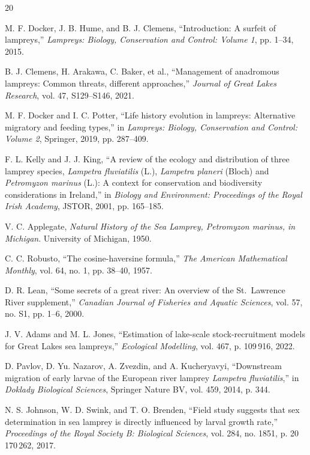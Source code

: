 \documentclass[11pt,a4paper]{ctexart}
\begin{document}
\begin{thebibliography}{20}

 M. F. Docker, J. B. Hume, and B. J. Clemens, ``Introduction: A surfeit of lampreys,'' \emph{Lampreys: Biology, Conservation and Control: Volume 1}, pp. 1--34, 2015.

 B. J. Clemens, H. Arakawa, C. Baker, et al., ``Management of anadromous lampreys: Common threats, different approaches,'' \emph{Journal of Great Lakes Research}, vol. 47, S129--S146, 2021.

 M. F. Docker and I. C. Potter, ``Life history evolution in lampreys: Alternative migratory and feeding types,'' in \emph{Lampreys: Biology, Conservation and Control: Volume 2}, Springer, 2019, pp. 287--409.

 F. L. Kelly and J. J. King, ``A review of the ecology and distribution of three lamprey species, \emph{Lampetra fluviatilis} (L.), \emph{Lampetra planeri} (Bloch) and \emph{Petromyzon marinus} (L.): A context for conservation and biodiversity considerations in Ireland,'' in \emph{Biology and Environment: Proceedings of the Royal Irish Academy}, JSTOR, 2001, pp. 165--185.

 V. C. Applegate, \emph{Natural History of the Sea Lamprey, Petromyzon marinus, in Michigan}. University of Michigan, 1950.

 C. C. Robusto, ``The cosine-haversine formula,'' \emph{The American Mathematical Monthly}, vol. 64, no. 1, pp. 38--40, 1957.

 D. R. Lean, ``Some secrets of a great river: An overview of the St.\ Lawrence River supplement,'' \emph{Canadian Journal of Fisheries and Aquatic Sciences}, vol. 57, no. S1, pp. 1--6, 2000.

 J. V. Adams and M. L. Jones, ``Estimation of lake-scale stock-recruitment models for Great Lakes sea lampreys,'' \emph{Ecological Modelling}, vol. 467, p. 109\,916, 2022.

 D. Pavlov, D. Yu. Nazarov, A. Zvezdin, and A. Kucheryavyi, ``Downstream migration of early larvae of the European river lamprey \emph{Lampetra fluviatilis},'' in \emph{Doklady Biological Sciences}, Springer Nature BV, vol. 459, 2014, p. 344.

 N. S. Johnson, W. D. Swink, and T. O. Brenden, ``Field study suggests that sex determination in sea lamprey is directly influenced by larval growth rate,'' \emph{Proceedings of the Royal Society B: Biological Sciences}, vol. 284, no. 1851, p. 20\,170\,262, 2017.


\end{thebibliography}
\end{document}
